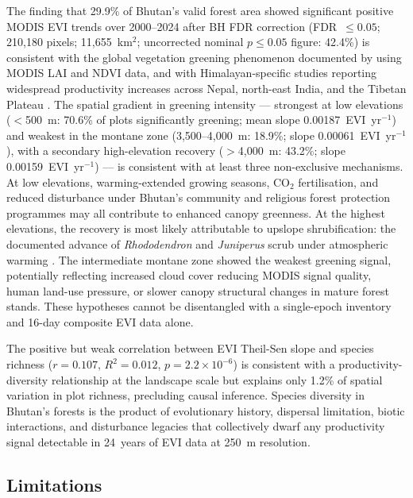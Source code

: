 \documentclass[review,12pt,a4paper]{elsarticle}
\begin{document}
The finding that 29.9\% of Bhutan's valid forest area showed significant
positive MODIS EVI trends over 2000--2024 after BH FDR correction
(FDR~$\leq 0.05$; 210{,}180 pixels; 11{,}655~km$^2$; uncorrected nominal
$p \leq 0.05$ figure: 42.4\%) is consistent with the global vegetation
greening phenomenon documented by \citet{zhu2016} using MODIS LAI and NDVI
data, and with Himalayan-specific studies reporting widespread productivity
increases across Nepal, north-east India, and the Tibetan Plateau
\citep{mishra2015, lamsal2017}. The spatial gradient in greening intensity ---
strongest at low elevations ($<$500~m: 70.6\% of plots significantly greening;
mean slope 0.00187~EVI~yr$^{-1}$) and weakest in the montane zone
(3{,}500--4{,}000~m: 18.9\%; slope 0.00061~EVI~yr$^{-1}$), with a secondary
high-elevation recovery ($>$4{,}000~m: 43.2\%; slope
0.00159~EVI~yr$^{-1}$) --- is consistent with at least three non-exclusive
mechanisms. At low elevations, warming-extended growing seasons, CO$_2$
fertilisation, and reduced disturbance under Bhutan's community and religious
forest protection programmes may all contribute to enhanced canopy greenness.
At the highest elevations, the recovery is most likely attributable to upslope
shrubification: the documented advance of \textit{Rhododendron} and
\textit{Juniperus} scrub under atmospheric warming \citep{liang2021}. The
intermediate montane zone showed the weakest greening signal, potentially
reflecting increased cloud cover reducing MODIS signal quality, human
land-use pressure, or slower canopy structural changes in mature forest stands.
These hypotheses cannot be disentangled with a single-epoch inventory and
16-day composite EVI data alone.

The positive but weak correlation between EVI Theil-Sen slope and species
richness ($r = 0.107$, $R^2 = 0.012$, $p = 2.2 \times 10^{-6}$) is
consistent with a productivity-diversity relationship at the landscape scale
but explains only 1.2\% of spatial variation in plot richness, precluding
causal inference. Species diversity in Bhutan's forests is the product of
evolutionary history, dispersal limitation, biotic interactions, and disturbance
legacies that collectively dwarf any productivity signal detectable in 24~years
of EVI data at 250~m resolution.

\subsection{Limitations}
\label{sec:disc_limitations}
\end{document}

